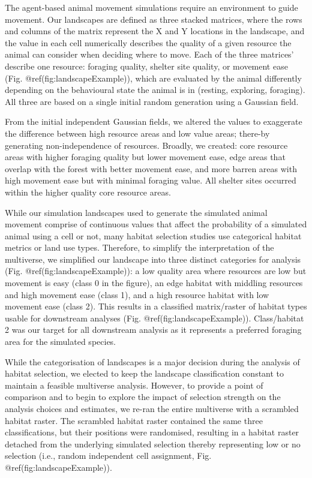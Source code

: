 \documentclass[10pt,a4paper]{article}
\begin{document}
The agent-based animal movement simulations require an environment to guide movement.
Our landscapes are defined as three stacked matrices, where the rows and columns of the matrix represent the X and Y locations in the landscape, and the value in each cell numerically describes the quality of a given resource the animal can consider when deciding where to move.
Each of the three matrices' describe one resource: foraging quality, shelter site quality, or movement ease (Fig. @ref(fig:landscapeExample)), which are evaluated by the animal differently depending on the behavioural state the animal is in (resting, exploring, foraging).
All three are based on a single initial random generation using a Gaussian field.

From the initial independent Gaussian fields, we altered the values to exaggerate the difference between high resource areas and low value areas; there-by generating non-independence of resources.
Broadly, we created: core resource areas with higher foraging quality but lower movement ease, edge areas that overlap with the forest with better movement ease, and more barren areas with high movement ease but with minimal foraging value.
All shelter sites occurred within the higher quality core resource areas.

While our simulation landscapes used to generate the simulated animal movement comprise of continuous values that affect the probability of a simulated animal using a cell or not, many habitat selection studies use categorical habitat metrics or land use types.
Therefore, to simplify the interpretation of the multiverse, we simplified our landscape into three distinct categories for analysis (Fig. @ref(fig:landscapeExample)): a low quality area where resources are low but movement is easy (class 0 in the figure), an edge habitat with middling resources and high movement ease (class 1), and a high resource habitat with low movement ease (class 2).
This results in a classified matrix/raster of habitat types usable for downstream analyses (Fig. @ref(fig:landscapeExample)).
Class/habitat 2 was our target for all downstream analysis as it represents a preferred foraging area for the simulated species.

While the categorisation of landscapes is a major decision during the analysis of habitat selection, we elected to keep the landscape classification constant to maintain a feasible multiverse analysis.
However, to provide a point of comparison and to begin to explore the impact of selection strength on the analysis choices and estimates, we re-ran the entire multiverse with a scrambled habitat raster.
The scrambled habitat raster contained the same three classifications, but their positions were randomised, resulting in a habitat raster detached from the underlying simulated selection thereby representing low or no selection (i.e., random independent cell assignment, Fig. @ref(fig:landscapeExample)).
\end{document}
